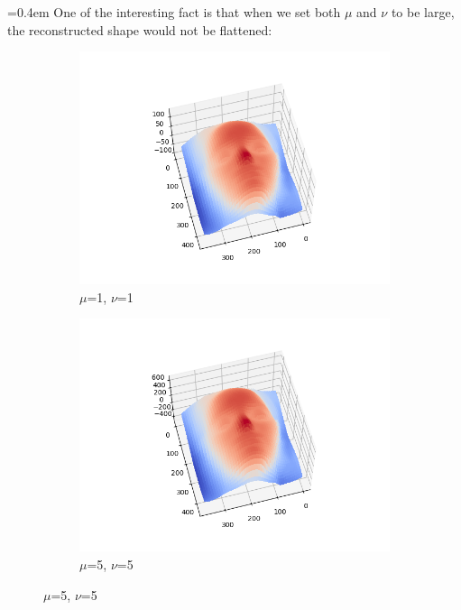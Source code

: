 \documentclass{article}
\begin{document}
	\hangindent=0.4em \hspace{0.3em}One of the interesting fact is that when we set both $\mu$ and $\nu$ to be large, the reconstructed shape would not be flattened:
\begin{figure}[H]	
	\begin{subfigure}{0.33\textwidth}
	\centering
	\includegraphics[width=\textwidth]{./src/2g_all_change/faceCalibrated_mu_1_v_1_lambda_1.png}
	\caption{$\mu$=1, $\nu$=1}
	\end{subfigure}
	\hfill
	\begin{subfigure}{0.32\textwidth}
	\centering
	\includegraphics[width=\textwidth]{./src/2g_all_change/faceCalibrated_mu_5_v_5_lambda_5.png}
	\caption{$\mu$=5, $\nu$=5}

\end{subfigure}
\end{figure}
\end{document}
